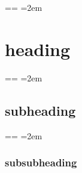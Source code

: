 \documentclass{book}
\makeatletter
\newenvironment{GNUTexinfopreformatted}{%
  \par\obeylines\obeyspaces\frenchspacing
  \parskip=\z@\parindent=\z@}{}
\newcommand{\GNUTexinfoplaceholder}[1]{}
\newcommand{\GNUTexinfonopagebreakheading}[2]{\let\clearpage\relax \let\cleardoublepage\relax \let\thispagestyle\GNUTexinfoplaceholder #1{#2}}
\makeatother
\begin{document}
\begin{GNUTexinfopreformatted}
\leftskip=2em\relax\ttfamily%

\end{GNUTexinfopreformatted}
\GNUTexinfonopagebreakheading{\section*}{{heading}}
\begin{GNUTexinfopreformatted}
\leftskip=2em\relax\ttfamily%

\end{GNUTexinfopreformatted}
\GNUTexinfonopagebreakheading{\subsection*}{{subheading}}
\begin{GNUTexinfopreformatted}
\leftskip=2em\relax\ttfamily%

\end{GNUTexinfopreformatted}
\GNUTexinfonopagebreakheading{\subsubsection*}{{subsubheading}}
\end{document}

